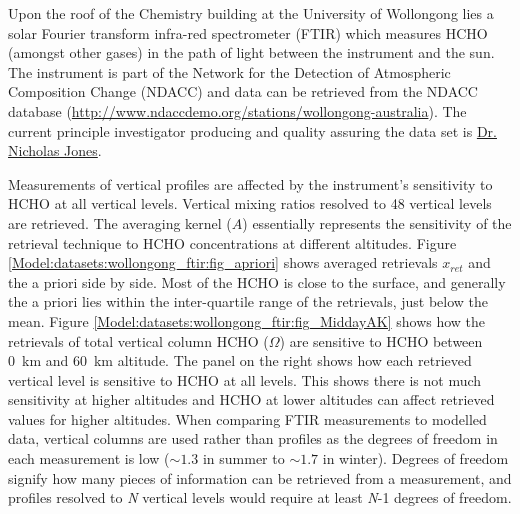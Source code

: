       Upon the roof of the Chemistry building at the University of Wollongong lies a solar Fourier transform infra-red spectrometer (FTIR) which measures HCHO (amongst other gases) in the path of light between the instrument and the sun.
      The instrument is part of the Network for the Detection of Atmospheric Composition Change (NDACC) and data can be retrieved from the NDACC database (\url{http://www.ndaccdemo.org/stations/wollongong-australia}).
      The current principle investigator producing and quality assuring the data set is \href{mailto:njones@uow.edu.au}{Dr. Nicholas Jones}.
      
      Measurements of vertical profiles are affected by the instrument's sensitivity to HCHO at all vertical levels.
      Vertical mixing ratios resolved to 48 vertical levels are retrieved. %
      The averaging kernel ($A$) essentially represents the sensitivity of the retrieval technique to HCHO concentrations at different altitudes.
      Figure \ref{Model:datasets:wollongong_ftir:fig_apriori} shows averaged retrievals $x_{ret}$ and the a priori side by side.
      Most of the HCHO is close to the surface, and generally the a priori lies within the inter-quartile range of the retrievals, just below the mean.
      Figure \ref{Model:datasets:wollongong_ftir:fig_MiddayAK} shows how the retrievals of total vertical column HCHO ($\Omega$) are sensitive to HCHO between 0~km and 60~km altitude.
      The panel on the right shows how each retrieved vertical level is sensitive to HCHO at all levels.
      This shows there is not much sensitivity at higher altitudes and HCHO at lower altitudes can affect retrieved values for higher altitudes.
      When comparing FTIR measurements to modelled data, vertical columns are used rather than profiles as the degrees of freedom in each measurement is low ($\sim 1.3$ in summer to $\sim 1.7$ in winter).
      Degrees of freedom signify how many pieces of information can be retrieved from a measurement, and profiles resolved to \textit{N} vertical levels would require at least \textit{N}-1 degrees of freedom.
      
      

